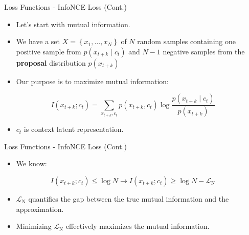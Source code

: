 \documentclass[serif, aspectratio=169]{beamer}
\begin{document}
\begin{frame}{Loss Functions - InfoNCE Loss (Cont.)}
     \begin{itemize}
         \item Let's start with mutual information.
         \item We have a set $X=\left\{x_1, \ldots, x_N\right\}$ of $N$ random samples containing one positive sample from $p\left(x_{t+k} \mid c_t\right)$ and $N - 1$ negative samples from the \textbf{proposal} distribution $p\left(x_{t+k}\right)$
         \item Our purpose is to maximize mutual information:
     \end{itemize}

     \begin{equation*}
         I(x_{t+k}; c_t)=\sum_{x_{t+k}, c_t} p(x_{t+k}, c_t) \log \frac{p(x_{t+k} \mid c_t)}{p(x_{t+k})}
     \end{equation*}

     \begin{itemize}
         \item $c_t$ is context latent representation.
     \end{itemize}
\end{frame}


\begin{frame}{Loss Functions - InfoNCE Loss (Cont.)}
     \begin{itemize}
         \item We know:
     \end{itemize}

     \begin{equation*}
         I(x_{t+k}; c_t) \leq \log N \xrightarrow{} I(x_{t+k}; c_t) \geq \log N - \mathcal{L}_{\mathrm{N}}
     \end{equation*}

     \begin{itemize}
         \item $\mathcal{L}_{\mathrm{N}}$ quantifies the gap between the true mutual information and the approximation.
         \item Minimizing $\mathcal{L}_{\mathrm{N}}$ effectively maximizes the mutual information.
     \end{itemize}
\end{frame}
\end{document}
